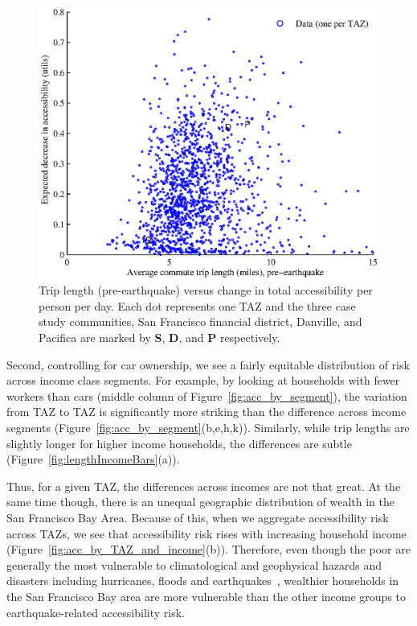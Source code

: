 %
\begin{figure}[h!]
\centering
\includegraphics[width=6in]{FIGS/equity_accLength2.eps} 
\caption{Trip length (pre-earthquake) versus change in total accessibility per person per day. Each dot represents one TAZ and the three case study communities, San Francisco financial district, Danville, and Pacifica are marked by \textbf{S}, \textbf{D}, and \textbf{P} respectively.}
\label{fig:accLength}
\end{figure}



Second, controlling for car ownership, we see a fairly equitable distribution of risk across income class segments.  For example, by looking at households with fewer workers than cars (middle column of Figure~\ref{fig:acc_by_segment}), the variation from TAZ to TAZ is significantly more striking than the difference across income segments (Figure~\ref{fig:acc_by_segment}{(b,e,h,k)}). Similarly, while trip lengths are slightly longer for higher income households, the differences are subtle (Figure~\ref{fig:lengthIncomeBars}{(a)}).


Thus, for a given TAZ, the differences across incomes are not that great. At the same time though, there is an unequal geographic distribution of wealth in the San Francisco Bay Area. Because of this, when we aggregate accessibility risk across TAZs, we see that accessibility risk rises with increasing household income  (Figure~\ref{fig:acc_by_TAZ_and_income}{(b)}). Therefore, even though the poor are generally the most vulnerable to climatological and geophysical hazards and disasters including hurricanes, floods and earthquakes~\cite{fothergill_race_1999},  wealthier households in the San Francisco Bay area are more vulnerable than the other income groups to earthquake-related accessibility risk.


